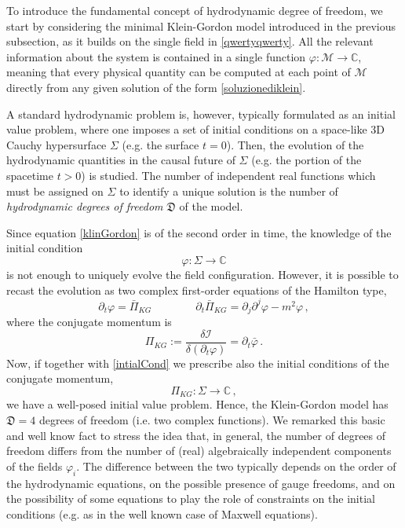 \documentclass[a4paper, amsfonts, amssymb, amsmath, reprint, twocolumn, showkeys, nofootinbib]{revtex4-2}
\begin{document}
To introduce the fundamental concept of hydrodynamic degree of freedom,
we start by considering the minimal Klein-Gordon model introduced in the previous subsection, as it builds on the single field in \eqref{qwertyqwerty}. All the relevant information about the system is contained in a single function  $\varphi : \mathcal{M} \longrightarrow \mathbb{C} $, 
meaning that every physical quantity can be computed at each point of $\mathcal{M}$ directly from any given  solution of the form \eqref{soluzionediklein}.

A standard hydrodynamic problem is, however, typically formulated as an initial value problem, where one imposes a set of initial conditions on a  space-like 3D Cauchy hypersurface $\Sigma$ (e.g. the surface $t=0$). 
Then, the evolution of the hydrodynamic quantities in the causal future of $\Sigma$ (e.g. the portion of the spacetime $t>0$) is studied. The number of independent real functions which must be assigned on $\Sigma$ to identify a unique solution is the number of \emph{hydrodynamic degrees of freedom} $\mathfrak{D}$ of the model.

Since equation \eqref{klinGordon} is of the second order in time, the knowledge of the initial condition
\begin{equation}\label{intialCond}
\varphi : \Sigma \longrightarrow \mathbb{C}
\end{equation}
is not enough to uniquely evolve the field configuration. However, 
it is possible to recast the evolution as two complex first-order equations of the Hamilton type,
\begin{equation}
 \partial_t \varphi = \bar{\Pi}_{KG} 
 \quad \quad \quad \quad 
 \partial_t \bar{\Pi}_{KG} = \partial_j \partial^j \varphi -m^2 \varphi \, , 
\end{equation}
where the conjugate momentum is
\begin{equation}
\Pi_{KG} := \dfrac{\delta \mathcal{I}}{\delta (\partial_t \varphi)} = \partial_t \bar{\varphi} \, .
\end{equation}
Now, if together with \eqref{intialCond} we prescribe also the initial conditions of the conjugate momentum,
\begin{equation}
\Pi_{KG} : \Sigma \longrightarrow \mathbb{C} \, ,
\end{equation}
we have a well-posed initial value problem. Hence, the Klein-Gordon model has $\mathfrak{D}=4$ degrees of freedom (i.e. two complex functions). We remarked this basic and well know fact to stress the idea that, in general, the number of degrees of freedom  differs from the number of (real) algebraically independent components of the fields $\varphi_i$. The difference between the two typically depends on the order of the hydrodynamic equations, on the possible presence of gauge freedoms, and on the possibility of some equations to play the role of constraints on the initial conditions (e.g. as in the well known case of Maxwell equations).
\end{document}
